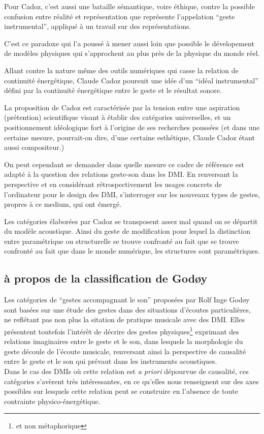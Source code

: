 Pour Cadoz, c'est aussi une bataille sémantique, voire éthique, contre la possible confusion entre réalité et représentation que représente l'appelation ``geste instrumental'', appliqué à un travail sur des représentations.

C'est ce paradoxe qui l'a poussé à mener aussi loin que possible le dévelopement de modèles physiques qui s'approchent au plus près de la physique du monde réel.

Allant contre la nature même des outils numériques qui casse la relation de continuité énergétique, Claude Cadoz poursuit une idée d'un ``idéal instrumental'' défini par la continuité énergétique entre le geste et le résultat sonore.

La proposition de Cadoz est caractérisée par la tension entre une aspiration (prétention) scientifique visant à établir des catégories universelles, et un positionnement idéologique fort à l'origine de ses recherches poussées (et dans une certaine mesure, pourrait-on dire, d'une certaine esthétique, Claude Cadoz étant aussi compositeur.)


On peut cependant se demander dans quelle mesure ce cadre de référence est adapté à la question des relations geste-son dans les DMI. En renversant la perspective et en considérant rétrospectivement les usages concrets de l'ordinateur pour le design des DMI, s'interroger sur les nouveaux types de gestes, propres à ce medium, qui ont émergé.

Les catégories élaborées par Cadoz se transposent assez mal quand on se départit du modèle acoustique. Ainsi du geste de modification pour lequel la distinction entre paramétrique ou structurelle se trouve confronté au fait que  se trouve confronté au fait que dans le monde numérique, les structures sont paramétriques.


\subsection{à propos de la classification de Godøy}
Les catégories de ``gestes accompagnant le son'' proposées par Rolf Inge Godøy sont basées sur une étude des gestes dans des situations d'écoutes particulières, ne reflétant pas non plus la sitation de pratique musicale avec des DMI. Elles présentent toutefois l'intérêt de décrire des gestes physiques\footnote{et non métaphorique} exprimant des relations imaginaires entre le geste et le son, dans lesquels la morphologie du geste découle de l'écoute musicale, renversant ainsi la perspective de causalité entre le geste et le son qui prévaut dans les instruments acoustiques.\\
\indent Dans le cas des DMIs où cette relation est \textit{a priori} dépourvue de causalité, ces catégories s'avèrent très intéressantes, en ce qu'elles nous renseignent sur des axes possibles sur lesquels cette relation peut se construire en l'absence de toute contrainte physico-énergétique.

